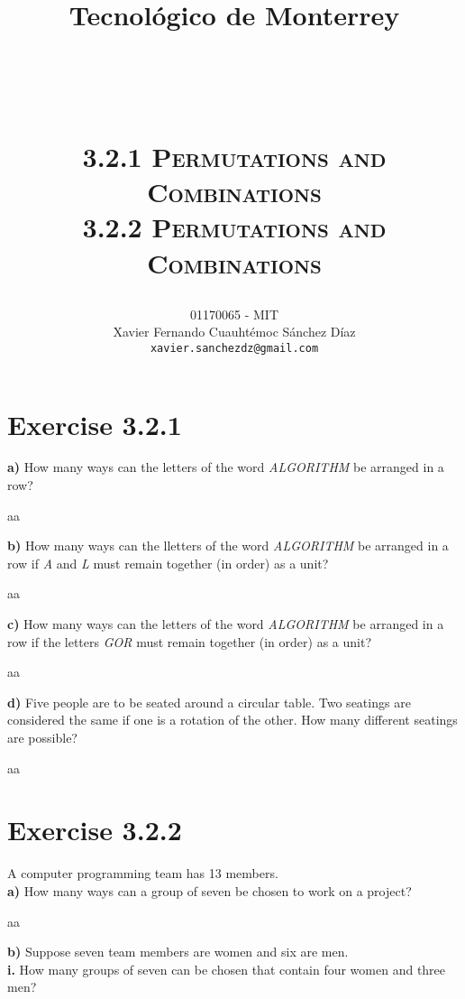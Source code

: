 \documentclass[titlepage, letterpaper, fleqn]{article}
\title{
\vspace{1in}
\textbf{Tecnológico de Monterrey} \\
\vspace{0.5in}
\textmd{\mahclass} \\
\large{\textit{\mahteacher}} \\
\vspace{0.5in}
\textsc{\mahtitle}\\
\textsc{3.2.1 Permutations and Combinations}\\
\textsc{3.2.2 Permutations and Combinations}\\
\author{01170065  - MIT \\
Xavier Fernando Cuauhtémoc Sánchez Díaz \\
\texttt{xavier.sanchezdz@gmail.com}}
\date{\mahdate}
}
\newcommand{\spacepls}{\vspace{5mm}}
\begin{document}
\begin{titlepage}
\maketitle
\end{titlepage}

%
%

\section{Exercise 3.2.1}

{\large \textbf{a)} How many ways can the letters of the word \textit{ALGORITHM} be arranged in a row?}

\spacepls

aa

{\large \textbf{b)} How many ways can the lletters of the word \textit{ALGORITHM} be arranged in a row if \textit{A} and \textit{L} must remain together (in order) as a unit?}

\spacepls

aa

{\large \textbf{c)} How many ways can the letters of the word \textit{ALGORITHM} be arranged in a row if the letters \textit{GOR} must remain together (in order) as a unit?}

\spacepls

aa

{\large \textbf{d)} Five people are to be seated around a circular table. Two seatings are considered the same if one is a rotation of the other. How many different seatings are possible?}

\spacepls

aa

\section{Exercise 3.2.2}

{\large A computer programming team has 13 members.\\
\textbf{a)} How many ways can a group of seven be chosen to work on a project?}

\spacepls

aa

{\large \textbf{b)} Suppose seven team members are women and six are men.\\
\textbf{i.} How many groups of seven can be chosen that contain four women and three men?}

\spacepls
\end{document}
